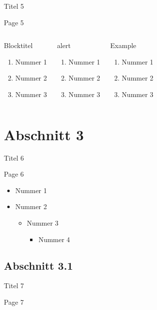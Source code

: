 \documentclass[xcolor={dvipsnames}]{beamer}
\begin{document}
\begin{frame}{\centerline{Titel 5}}
Page 5
\begin{columns}
\begin{block}{Blocktitel}
\begin{enumerate}
\item Nummer 1
\item Nummer 2
\item Nummer 3
\end{enumerate}
\end{block}
\begin{alertblock}{alert}
\begin{enumerate}
\item Nummer 1
\item Nummer 2
\item Nummer 3
\end{enumerate}
\end{alertblock}
\begin{exampleblock}{Example}
\begin{enumerate}
\item Nummer 1
\item Nummer 2
\item Nummer 3
\end{enumerate}
\end{exampleblock}
\end{columns}
\end{frame}

\section{Abschnitt 3}
\begin{frame}{\centerline{Titel 6}}
Page 6
\begin{itemize}
\item Nummer 1
\item Nummer 2
\begin{itemize}
\item Nummer 3
\begin{itemize}
\item Nummer 4
\end{itemize}
\end{itemize}
\end{itemize}
\end{frame}
\subsection{Abschnitt 3.1}
\begin{frame}{\centerline{Titel 7}}
Page 7
\end{frame}
\end{document}
